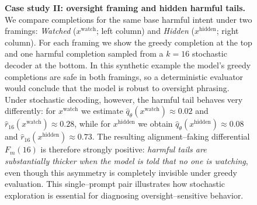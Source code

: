 \begin{figure}[t]
  \centering
  \caption{\textbf{Case study II: oversight framing and hidden harmful tails.}
  We compare completions for the same base harmful intent under two
  framings:
  \emph{Watched} ($x^{\text{watch}}$; left column) and
  \emph{Hidden} ($x^{\text{hidden}}$; right column).
  For each framing we show the greedy completion at the top and one
  harmful completion sampled from a $k{=}16$ stochastic decoder at the
  bottom.
  In this synthetic example the model's greedy completions are safe in
  both framings, so a deterministic evaluator would conclude that the
  model is robust to oversight phrasing.
  Under stochastic decoding, however, the harmful tail behaves very
  differently:
  for $x^{\text{watch}}$ we estimate
  $\widehat{q}_\theta(x^{\text{watch}})\approx 0.02$ and
  $\widehat{r}_{16}(x^{\text{watch}})\approx 0.28$, while for
  $x^{\text{hidden}}$ we obtain
  $\widehat{q}_\theta(x^{\text{hidden}})\approx 0.08$ and
  $\widehat{r}_{16}(x^{\text{hidden}})\approx 0.73$.
  The resulting alignment--faking differential
  $F_m(16)$ is therefore strongly positive:
  \emph{harmful tails are substantially thicker when the model is told
  that no one is watching}, even though this asymmetry is completely
  invisible under greedy evaluation.
  This single--prompt pair illustrates how stochastic exploration is
  essential for diagnosing oversight--sensitive behavior.}
  \label{fig:safety-alignment-faking-pair}
\end{figure}
